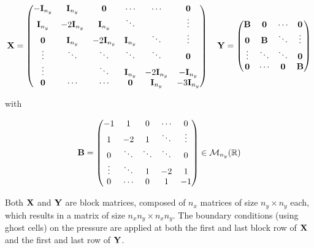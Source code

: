 \begin{equation*}
  \boldsymbol{\mathrm{X}} = \begin{pmatrix}
    -\boldsymbol{\mathrm{I}}_{n_y} & \boldsymbol{\mathrm{I}}_{n_y}   & \boldsymbol{\mathrm{0}}         & \cdots       & \cdots         & \boldsymbol{\mathrm{0}}         \\
    \boldsymbol{\mathrm{I}}_{n_y}  & -2\boldsymbol{\mathrm{I}}_{n_y} & \boldsymbol{\mathrm{I}}_{n_y}   & \ddots       &                & \vdots         \\
    \boldsymbol{\mathrm{0}}        & \boldsymbol{\mathrm{I}}_{n_y}   & -2\boldsymbol{\mathrm{I}}_{n_y} & \boldsymbol{\mathrm{I}}_{n_y} & \ddots         & \vdots         \\
    \vdots        & \ddots         & \ddots         & \ddots       & \ddots         & \boldsymbol{\mathrm{0}}         \\
    \vdots        &                & \ddots         & \boldsymbol{\mathrm{I}}_{n_y} & -2\boldsymbol{\mathrm{I}}_{n_y} & -\boldsymbol{\mathrm{I}}_{n_y}  \\
    \boldsymbol{\mathrm{0}}        & \cdots         & \cdots         & \boldsymbol{\mathrm{0}}       & \boldsymbol{\mathrm{I}}_{n_y}   & -3\boldsymbol{\mathrm{I}}_{n_y} \\
  \end{pmatrix}\quad
  \boldsymbol{\mathrm{Y}} = \begin{pmatrix}
    \boldsymbol{\mathrm{B}} & \boldsymbol{\mathrm{0}} & \cdots & \boldsymbol{\mathrm{0}} \\
    \boldsymbol{\mathrm{0}} & \boldsymbol{\mathrm{B}} & \ddots & \vdots \\
    \vdots & \ddots & \ddots & \boldsymbol{\mathrm{0}} \\
    \boldsymbol{\mathrm{0}} & \cdots & \boldsymbol{\mathrm{0}} & \boldsymbol{\mathrm{B}} \\
  \end{pmatrix}
\end{equation*}

with

$$
  \boldsymbol{\mathrm{B}} = \begin{pmatrix}
    -1     & 1      & 0      & \cdots & 0      \\
    1      & -2     & 1      & \ddots & \vdots \\
    0      & \ddots & \ddots & \ddots & 0      \\
    \vdots & \ddots & 1      & -2     & 1      \\
    0      & \cdots & 0      & 1      & -1     \\
  \end{pmatrix}\in\mathcal{M}_{n_y}(\mathbb{R})
$$

Both $\boldsymbol{\mathrm{X}}$ and $\boldsymbol{\mathrm{Y}}$ are block matrices, composed of $n_x$ matrices of size $n_y\times n_y$ each, which results in a matrix of size $n_xn_y\times n_xn_y$.
The boundary conditions (using ghost cells) on the pressure are applied at both the first and last block row of $\boldsymbol{\mathrm{X}}$ and the first and last row of $\boldsymbol{\mathrm{Y}}$.

